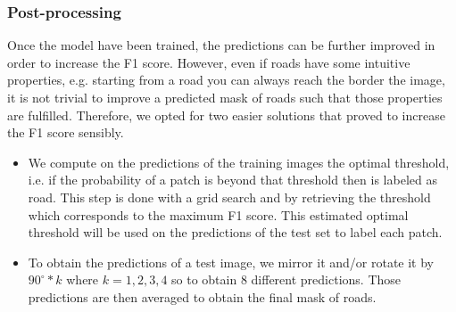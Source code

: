 \documentclass[10pt,conference,compsocconf]{IEEEtran}
\begin{document}
\subsubsection*{Post-processing}
Once the model have been trained, the predictions can be further improved in order to increase the F1 score. However, even if roads have some intuitive properties, e.g. starting from a road you can always reach the border the image, it is not trivial to improve a predicted mask of roads such that those properties are fulfilled. Therefore, we opted for two easier solutions that proved to increase the F1 score sensibly.
\begin{itemize}
	\item We compute on the predictions of the training images the optimal threshold, i.e. if the probability of a patch is beyond that threshold then is labeled as road. This step is done with a grid search and by retrieving the threshold which corresponds to the maximum F1 score. This estimated optimal threshold will be used on the predictions of the test set to label each patch.
	\item To obtain the predictions of a test image, we mirror it and/or rotate it by $90^\circ*k$ where $k=1,2,3,4$ so to obtain 8 different predictions. Those predictions are then averaged to obtain the final mask of roads.
\end{itemize}

%
%
%
%
%
\end{document}
